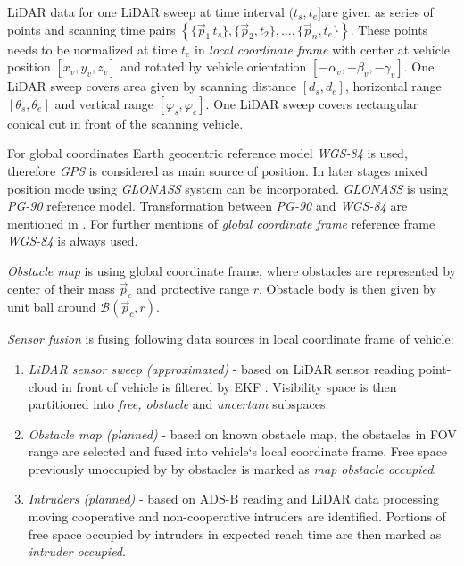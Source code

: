 LiDAR data for one LiDAR sweep at time interval $(t_s, t_e] $are given as series of points and scanning time pairs $\left\{\{\vec{p}_1\,t_s\},\{\vec{p}_2,t_2\},\dots,\{\vec{p}_n,t_e\}\right\}$. These points needs to be normalized at time $t_e$ in \textit{local coordinate frame} with center at vehicle position $[x_v,y_v,z_v]$ and rotated by vehicle orientation $[-\alpha_v,-\beta_v,-\gamma_v]$. One LiDAR sweep covers area given by scanning distance $[d_s,d_e]$, horizontal range $[\theta_s,\theta_e]$ and vertical range $[\varphi_s,\varphi_e]$. One LiDAR sweep covers rectangular conical cut in front of the scanning vehicle.

For global coordinates Earth geocentric reference model \textit{WGS-84} is used, therefore \textit{GPS} is considered as main source of position. In later stages mixed position mode using \textit{GLONASS} system can be incorporated. \textit{GLONASS} is using \textit{PG-90} reference model. Transformation between \textit{PG-90} and \textit{WGS-84} are mentioned in \cite{misra1996integrated}. For further mentions of \textit{global coordinate frame} reference frame \textit{WGS-84} is always used.

\textit{Obstacle map} is using global coordinate frame, where obstacles are represented by center of their mass $\vec{p}_c$ and protective range $r$. Obstacle body is then given by unit ball around $\mathscr{B}(\vec{p}_c,r)$.

\newpage\noindent\textit{Sensor fusion} is fusing following data sources in local coordinate frame of vehicle:
\begin{enumerate}
    \item \textit{LiDAR sensor sweep (approximated)} - based on LiDAR sensor reading point-cloud in front of vehicle is filtered by EKF \cite{blanc2005ekf}. Visibility space is then partitioned into \textit{free, obstacle} and \textit{uncertain} subspaces.
    \item \textit{Obstacle map (planned)} - based on known obstacle map, the obstacles in FOV range are selected and fused into vehicle`s local coordinate frame. Free space previously unoccupied by by obstacles is marked as \textit{map obstacle occupied}.
    \item \textit{Intruders (planned)} - based on ADS-B reading and LiDAR data processing moving cooperative and non-cooperative intruders are identified. Portions of free space occupied by intruders in expected reach time are then marked as \textit{intruder occupied}.
\end{enumerate}

